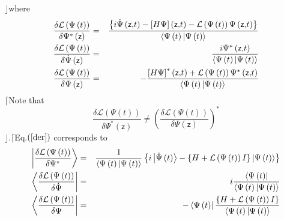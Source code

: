 \documentclass[aps,preprint]{revtex4}
\begin{document}
$\rfloor $where 
\begin{eqnarray}
\frac{\delta \mathcal{L}\left( \Psi \left( t\right) \right) }{\delta \Psi
^{\ast }\left( \mathsf{z}\right) } &=&\frac{\left\{ i\dot{\Psi}\left( 
\mathsf{z,}t\right) -\left[ H\Psi \right] \left( \mathsf{z,}t\right) -%
\mathcal{L}\left( \Psi \left( t\right) \right) \Psi \left( \mathsf{z,}%
t\right) \right\} }{\left\langle \Psi \left( t\right) |\Psi \left( t\right)
\right\rangle }  \notag \\
\frac{\delta \mathcal{L}\left( \Psi \left( t\right) \right) }{\delta \dot{%
\Psi}\left( \mathsf{z}\right) } &=&\frac{i\Psi ^{\ast }\left( \mathsf{z,}%
t\right) }{\left\langle \Psi \left( t\right) |\Psi \left( t\right)
\right\rangle }  \notag \\
\frac{\delta \mathcal{L}\left( \Psi \left( t\right) \right) }{\delta \Psi
\left( \mathsf{z}\right) } &=&-\frac{\left[ H\Psi \right] ^{\ast }\left( 
\mathsf{z,}t\right) +\mathcal{L}\left( \Psi \left( t\right) \right) \Psi
^{\ast }\left( \mathsf{z,}t\right) }{\left\langle \Psi \left( t\right) |\Psi
\left( t\right) \right\rangle }  \label{der}
\end{eqnarray}%
$\lceil $Note that 
\begin{equation}
\frac{\delta \mathcal{L}\left( \Psi \left( t\right) \right) }{\delta \Psi
^{\ast }\left( \mathsf{z}\right) }\neq \left( \frac{\delta \mathcal{L}\left(
\Psi \left( t\right) \right) }{\delta \Psi \left( \mathsf{z}\right) }\right)
^{\ast }
\end{equation}%
$\rfloor $.$\lceil $Eq.$\left( \ref{der}\right) $ corresponds to 
\begin{eqnarray}
\left| \frac{\delta \mathcal{L}\left( \Psi \left( t\right) \right) }{\delta
\Psi ^{\ast }}\right\rangle &=&\frac{1}{\left\langle \Psi \left( t\right)
|\Psi \left( t\right) \right\rangle }\left\{ i\left| \dot{\Psi}\left(
t\right) \right\rangle -\left\{ H+\mathcal{L}\left( \Psi \left( t\right)
\right) I\right\} \left| \Psi \left( t\right) \right\rangle \right\}  \notag
\\
\left\langle \frac{\delta \mathcal{L}\left( \Psi \left( t\right) \right) }{%
\delta \dot{\Psi}}\right| &=&i\frac{\left\langle \Psi \left( t\right)
\right| }{\left\langle \Psi \left( t\right) |\Psi \left( t\right)
\right\rangle }  \notag \\
\left\langle \frac{\delta \mathcal{L}\left( \Psi \left( t\right) \right) }{%
\delta \Psi }\right| &=&-\left\langle \Psi \left( t\right) \right| \frac{%
\left\{ H+\mathcal{L}\left( \Psi \left( t\right) \right) I\right\} }{%
\left\langle \Psi \left( t\right) |\Psi \left( t\right) \right\rangle }
\end{eqnarray}%
\end{document}
